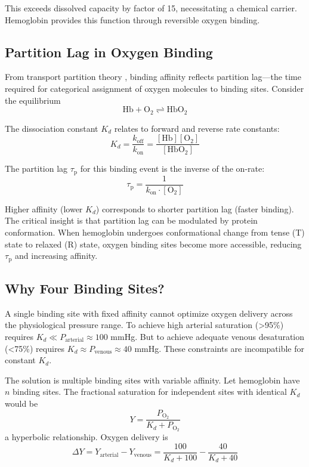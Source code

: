 \documentclass[10pt,twocolumn,a4paper]{article}
\theoremstyle{remark}
\newcommand{\taulag}{\tau_{\mathrm{p}}}
\begin{document}
This exceeds dissolved capacity by factor of 15, necessitating a chemical carrier. Hemoglobin provides this function through reversible oxygen binding.

\subsection{Partition Lag in Oxygen Binding}

From transport partition theory \cite{sachikonye2024transport}, binding affinity reflects partition lag—the time required for categorical assignment of oxygen molecules to binding sites. Consider the equilibrium
\begin{equation}
\mathrm{Hb} + \mathrm{O}_{2} \rightleftharpoons \mathrm{HbO}_{2}
\end{equation}

The dissociation constant $K_{d}$ relates to forward and reverse rate constants:
\begin{equation}
K_{d} = \frac{k_{\mathrm{off}}}{k_{\mathrm{on}}} = \frac{[\mathrm{Hb}][\mathrm{O}_{2}]}{[\mathrm{HbO}_{2}]}
\end{equation}

The partition lag $\taulag$ for this binding event is the inverse of the on-rate:
\begin{equation}
\taulag = \frac{1}{k_{\mathrm{on}} \cdot [\mathrm{O}_{2}]}
\end{equation}

Higher affinity (lower $K_{d}$) corresponds to shorter partition lag (faster binding). The critical insight is that partition lag can be modulated by protein conformation. When hemoglobin undergoes conformational change from tense (T) state to relaxed (R) state, oxygen binding sites become more accessible, reducing $\taulag$ and increasing affinity.

\subsection{Why Four Binding Sites?}

A single binding site with fixed affinity cannot optimize oxygen delivery across the physiological pressure range. To achieve high arterial saturation (>95\%) requires $K_{d} \ll P_{\mathrm{arterial}} \approx 100$ mmHg. But to achieve adequate venous desaturation (<75\%) requires $K_{d} \approx P_{\mathrm{venous}} \approx 40$ mmHg. These constraints are incompatible for constant $K_{d}$.

The solution is multiple binding sites with variable affinity. Let hemoglobin have $n$ binding sites. The fractional saturation for independent sites with identical $K_{d}$ would be
\begin{equation}
Y = \frac{P_{\mathrm{O}_{2}}}{K_{d} + P_{\mathrm{O}_{2}}}
\end{equation}
a hyperbolic relationship. Oxygen delivery is
\begin{equation}
\Delta Y = Y_{\mathrm{arterial}} - Y_{\mathrm{venous}} = \frac{100}{K_{d} + 100} - \frac{40}{K_{d} + 40}
\end{equation}
\end{document}
